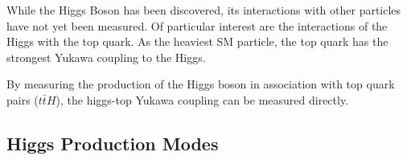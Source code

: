 While the Higgs Boson has been discovered, its interactions with other particles have not yet been measured. Of particular interest are the interactions of the Higgs with the top quark. As the heaviest SM particle, the top quark has the strongest Yukawa coupling to the Higgs. 

By measuring the production of the Higgs boson in association with top quark pairs ($t\bar{t}H$), the higgs-top Yukawa coupling can be measured directly. 

\subsection{Higgs Production Modes}
\label{sec:higgsModes}
